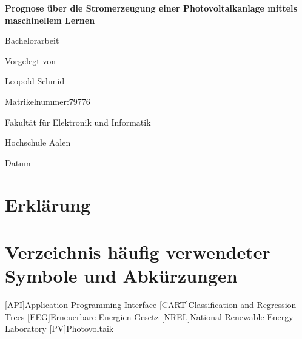 \documentclass[12pt, a4paper]{article}
\begin{document}
\begin{titlepage}
    \begin{center}
        \vspace*{1cm}
        
        \textbf{\LARGE{Prognose über die Stromerzeugung einer Photovoltaikanlage mittels maschinellem Lernen}}
        
        \vspace{0.5cm}
        \Large{Bachelorarbeit}
        
        \vspace{1.5cm}
        \Large{Vorgelegt von}
        
        \vspace{0.5cm}
        \Large{Leopold Schmid}
        
        \vspace{1.5cm}
        \Large{Matrikelnummer:79776}
        
        \vfill
        
        \Large{Fakultät für Elektronik und Informatik}
        
        \vspace{0.5cm}
        \Large{Hochschule Aalen}
        
        \vspace{1.5cm}
        \Large{Datum}
        
    \end{center}
\end{titlepage}


\newpage

\section*{Erklärung}


\newpage


\section*{Verzeichnis häufig verwendeter Symbole und Abkürzungen}

\begin{acronym}
[API]{Application Programming Interface}
[CART]{Classification and Regression Trees}
[EEG]{Erneuerbare-Energien-Gesetz}
[NREL]{National Renewable Energy Laboratory}
[PV]{Photovoltaik}
\end{acronym}

\newpage
\end{document}
